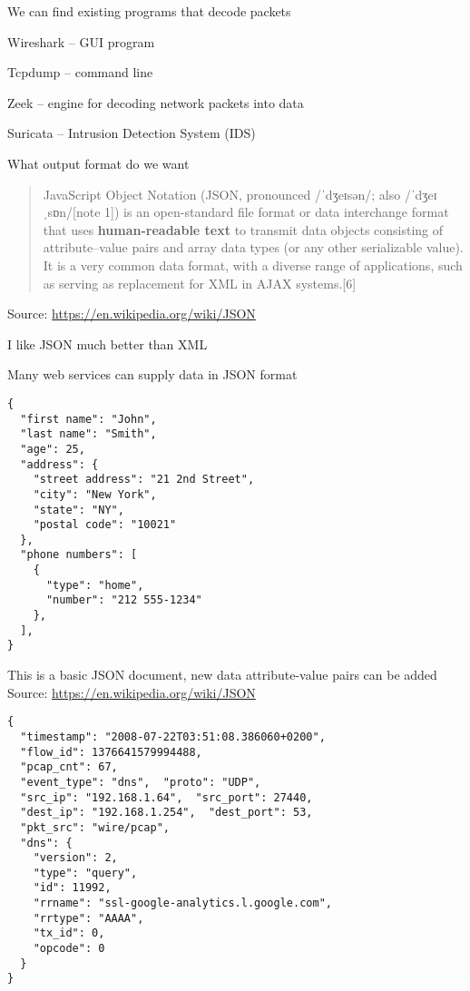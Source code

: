 \documentclass[Screen16to9,17pt]{foils}
\begin{document}
We can find existing programs that decode packets
\begin{list2}
\item Wireshark -- GUI program
\item Tcpdump -- command line
\item Zeek -- engine for decoding network packets into data
\item Suricata -- Intrusion Detection System (IDS)
\end{list2}

What output format do we want



\begin{quote}
JavaScript Object Notation (JSON, pronounced /ˈdʒeɪsən/; also /ˈdʒeɪˌsɒn/[note 1]) is an open-standard file format or data interchange format that uses {\bf human-readable text} to transmit data objects consisting of attribute–value pairs and array data types (or any other serializable value). It is a very common data format, with a diverse range of applications, such as serving as replacement for XML in AJAX systems.[6]
\end{quote}
Source: \url{https://en.wikipedia.org/wiki/JSON}

\begin{list2}
\item I like JSON much better than XML
\item Many web services can supply data in JSON format
\end{list2}


\begin{verbatim}
{
  "first name": "John",
  "last name": "Smith",
  "age": 25,
  "address": {
    "street address": "21 2nd Street",
    "city": "New York",
    "state": "NY",
    "postal code": "10021"
  },
  "phone numbers": [
    {
      "type": "home",
      "number": "212 555-1234"
    },
  ],
}
\end{verbatim}

\begin{list2}
\item This is a basic JSON document, new data attribute-value pairs can be added\\
Source: \url{https://en.wikipedia.org/wiki/JSON}
\end{list2}



\begin{verbatim}
{
  "timestamp": "2008-07-22T03:51:08.386060+0200",
  "flow_id": 1376641579994488,
  "pcap_cnt": 67,
  "event_type": "dns",  "proto": "UDP",
  "src_ip": "192.168.1.64",  "src_port": 27440,
  "dest_ip": "192.168.1.254",  "dest_port": 53,
  "pkt_src": "wire/pcap",
  "dns": {
    "version": 2,
    "type": "query",
    "id": 11992,
    "rrname": "ssl-google-analytics.l.google.com",
    "rrtype": "AAAA",
    "tx_id": 0,
    "opcode": 0
  }
}
\end{verbatim}
\end{document}
